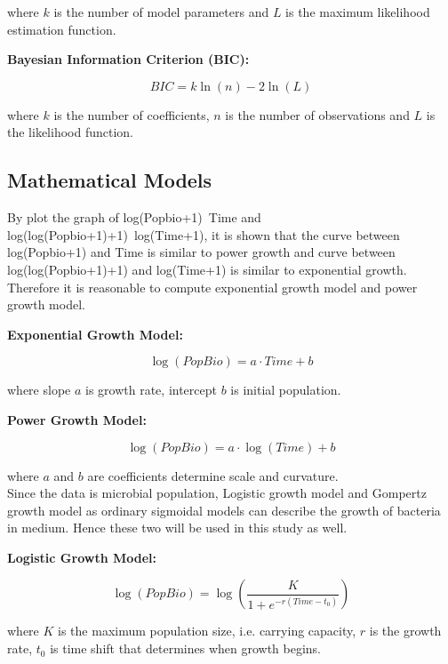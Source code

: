\documentclass[11pt]{article}
\begin{document}
where $k$ is the number of model parameters and $L$ is the maximum likelihood estimation function.

\textbf{Bayesian Information Criterion (BIC):}

\begin{equation}
BIC = k \ln(n) - 2 \ln(L)
\end{equation}

where $k$ is the number of coefficients, $n$ is the number of observations and $L$ is the likelihood function.

\subsection{Mathematical Models}

By plot the graph of log(Popbio+1)~Time and log(log(Popbio+1)+1)~log(Time+1), it is shown that the curve between log(Popbio+1) and Time is similar to power growth and curve between log(log(Popbio+1)+1) and log(Time+1) is similar to exponential growth. Therefore it is reasonable to compute exponential growth model and power growth model. 

\textbf{Exponential Growth Model:}

\begin{equation}
\log(PopBio) = a \cdot Time + b
\end{equation}

where slope $a$ is growth rate, intercept $b$ is initial population.

\textbf{Power Growth Model:}

\begin{equation}
\log(PopBio) = a \cdot \log(Time) + b
\end{equation}

where $a$ and $b$ are coefficients determine scale and curvature.\\

\noindent Since the data is microbial population, Logistic growth model and Gompertz growth model as ordinary sigmoidal models can describe the growth of bacteria in medium. Hence these two will be used in this study as well.

\textbf{Logistic Growth Model:}

\begin{equation}
\log(PopBio) = \log\left(\frac{K}{1 + e^{-r (Time - t_0)}}\right)
\end{equation}

where $K$ is the maximum population size, i.e. carrying capacity, $r$ is the growth rate, $t_0$ is time shift that determines when growth begins.
\end{document}
